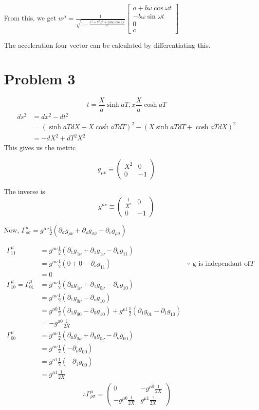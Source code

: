 \documentclass[12pt]{article}
\begin{document}
From this, we get $w^\mu=\frac{1}{\sqrt{1-\frac{a^2 +b^2\omega^2 + 2ab\omega\cos\omega t}{c^2}}}\begin{bmatrix}

a+b\omega\cos\omega t\\
-b\omega\sin\omega t\\
0\\
c
\end{bmatrix}$

The acceleration four vector can be calculated by differentiating this. 

\section*{Problem 3}
$$t=\frac{X}{a}\sinh aT, x\frac{X}{a}\cosh a T$$
\begin{align*}
ds^2&=dx^2-dt^2\\
&= (\sinh aTdX + X\cosh aT dT)^2 - (X\sinh aTdT + \cosh aT dX)^2 \\
&= -dX^2 + dT^2 X^2
\end{align*}
This gives us the metric

$$g_{\mu\nu}\equiv\begin{pmatrix}
X^2 & 0\\ 0 & -1
\end{pmatrix}$$

The inverse is 
$$g^{\mu\nu}\equiv\begin{pmatrix}
\frac1{X^2} & 0\\ 0 & -1
\end{pmatrix}$$

Now, $\Gamma^\mu_{\rho\sigma}=g^{\mu\nu}\frac12(\partial_\sigma g_{\rho\nu}+\partial_\rho g_{\sigma\nu}-\partial_\nu g_{\rho\sigma})$

\begin{align*}
\Gamma^\mu_{11}&=g^{\mu\nu}\frac12(\partial_1 g_{1\nu}+\partial_1 g_{1\nu}-\partial_\nu g_{11})\\
&=g^{\mu\nu}\frac12(0+0-\partial_\nu g_{11})\qquad&\because \text{ g is independant of $T$}\\
&=0\\
\Gamma^\mu_{10}=\Gamma^\mu_{01}&=g^{\mu\nu}\frac12(\partial_0 g_{1\nu}+\partial_1 g_{0\nu}-\partial_\nu g_{10})\\
&=g^{\mu\nu}\frac12(\partial_1 g_{0\nu}-\partial_\nu g_{10})\\
&=g^{\mu0}\frac12(\partial_1 g_{00}-\partial_0 g_{10})+g^{\mu1}\frac12(\partial_1 g_{01}-\partial_1 g_{10})\\
&=-g^{\mu0}\frac1{2X}\\
\Gamma^\mu_{00}&=g^{\mu\nu}\frac12(\partial_0 g_{0\nu}+\partial_0 g_{0\nu}-\partial_\nu g_{00})\\
&=g^{\mu\nu}\frac12(-\partial_\nu g_{00})\\
&=g^{\mu1}\frac12(-\partial_1 g_{00})\\
&=g^{\mu1}\frac1{2X}\\
\end{align*}
$$\therefore\Gamma^\mu_{\rho\sigma}=\begin{pmatrix}
0 & -g^{\mu0}\frac1{2X}\\
-g^{\mu0}\frac1{2X} & g^{\mu1}\frac1{2X}
\end{pmatrix}$$
\end{document}
